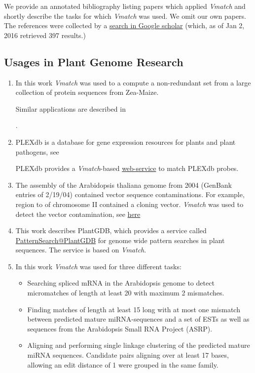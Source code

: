 \documentclass[12pt]{article}
\newcommand{\Vmatch}[0]{\textit{Vmatch}\xspace}
\newcommand{\Mybibentry}[2]{\item \bibentry{#1} \par%
In this work \Vmatch was used \xspace #2\xspace}
\begin{document}
We provide an annotated bibliography listing papers which applied \Vmatch
and shortly describe the tasks for which \Vmatch was used. We omit our own
papers. The references were collected by a
\href{https://scholar.google.de/scholar?q=Vmatch+AND+Kurtz+OR+www.vmatch.de}%
     {search in Google scholar}
(which, as of Jan 2, 2016 retrieved 397 results.)

\subsection*{Usages in Plant Genome Research}
\begin{enumerate}
\Mybibentry{BRE:KUR:WAL:2002}{
to a compute a non-redundant set from a large collection of protein sequences
from Zea-Maize.}

Similar applications are described in

.
\item
PLEXdb is a database for gene expression resources for plants and plant
pathogens, see


PLEXdb provides a \Vmatch-based
\href{http://www.plantgdb.org/cgi-bin/prj/PLEXdb/ProbeMatch.pl}{web-service}
to match PLEXdb probes.

\item
The assembly of the Arabidopsis thaliana genome from 2004
(GenBank entries of 2/19/04) contained vector sequence contaminations.
For example, region  to  of
chromosome II contained
a cloning vector. \Vmatch was used to detect the vector contamination,
see \href{http://www.plantgdb.org/AtGDB/Annotation/vector.php}{here}

\item
{}

This work describes PlantGDB, which
provides a service called
\href{http://www.plantgdb.org/PlantGDB-cgi/vmatch/patternsearch.pl}{PatternSearch@PlantGDB}
for genome wide pattern searches in plant sequences. The service is based
on \Vmatch.
\Mybibentry{LIN:KRO:2005}{
for three different tasks:
\begin{itemize}
\item
Searching spliced mRNA in the Arabidopsis genome to detect
micromatches of length at least 20 with maximum 2 mismatches.
\item
Finding matches of length at least 15 long with at most one mismatch
between predicted mature miRNA-sequences and a set of ESTs as well
as sequences from the Arabidopsis Small RNA Project (ASRP).
\item
Aligning and performing single linkage clustering
of the predicted mature miRNA sequences. Candidate pairs aligning over at least
17 bases, allowing an edit distance of 1 were grouped in the same family.
\end{itemize}}


\end{enumerate}
\end{document}

